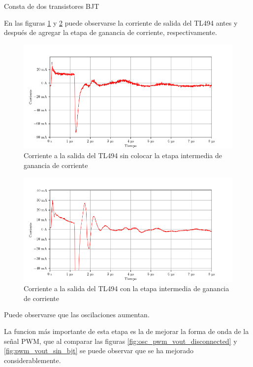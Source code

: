 Consta de dos transistores BJT %

En las figuras \ref{fig:pwm_iout_sin_bjt} y \ref{fig:pwm_iout_con_bjt} puede observarse la corriente de salida del TL494 antes y después de agregar la etapa de ganancia de corriente, respectivamente.

\begin{figure}[H]
    \centering
    \includegraphics[width=\textwidth]{images/capturas-osciloscopio/TL494/pwm_iout_sin_bjt.png}
    \caption{Corriente a la salida del TL494 sin colocar la etapa intermedia de ganancia de corriente}
    \label{fig:pwm_iout_sin_bjt}
\end{figure}

\begin{figure}[H]
    \centering
    \includegraphics[width=\textwidth]{images/capturas-osciloscopio/BJT/bjt-iin-con-etapa.png}
    \caption{Corriente a la salida del TL494 con la etapa intermedia de ganancia de corriente}
    \label{fig:pwm_iout_con_bjt}
\end{figure}

Puede observarse que las oscilaciones aumentan. %

La funcion más importante de esta etapa es la de mejorar la forma de onda de la señal PWM, que al comparar las figuras \ref{fig:osc_pwm_vout_disconnected} y \ref{fig:pwm_vout_sin_bjt} se puede observar que se ha mejorado considerablemente.

